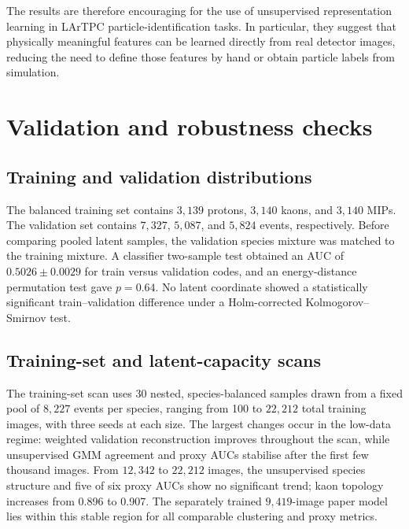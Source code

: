\documentclass{article}
\begin{document}
The results are therefore encouraging for the use of unsupervised representation learning in LArTPC particle-identification tasks. In particular, they suggest that physically meaningful features can be learned directly from real detector images, reducing the need to define those features by hand or obtain particle labels from simulation.

\clearpage



\clearpage
\appendix

\section{Validation and robustness checks}
\label{app:checks}

\subsection{Training and validation distributions}

The balanced training set contains $3{,}139$ protons, $3{,}140$ kaons, and $3{,}140$ MIPs. The validation set contains $7{,}327$, $5{,}087$, and $5{,}824$ events, respectively. Before comparing pooled latent samples, the validation species mixture was matched to the training mixture. A classifier two-sample test obtained an AUC of $0.5026\pm0.0029$ for train versus validation codes, and an energy-distance permutation test gave $p=0.64$. No latent coordinate showed a statistically significant train--validation difference under a Holm-corrected Kolmogorov--Smirnov test. 

\subsection{Training-set and latent-capacity scans}

The training-set scan uses 30 nested, species-balanced samples drawn from a fixed pool of $8{,}227$ events per species, ranging from 100 to $22{,}212$ total training images, with three seeds at each size. The largest changes occur in the low-data regime: weighted validation reconstruction improves throughout the scan, while unsupervised GMM agreement and proxy AUCs stabilise after the first few thousand images. From $12{,}342$ to $22{,}212$ images, the unsupervised species structure and five of six proxy AUCs show no significant trend; kaon topology increases from 0.896 to 0.907. The separately trained $9{,}419$-image paper model lies within this stable region for all comparable clustering and proxy metrics.
\end{document}
